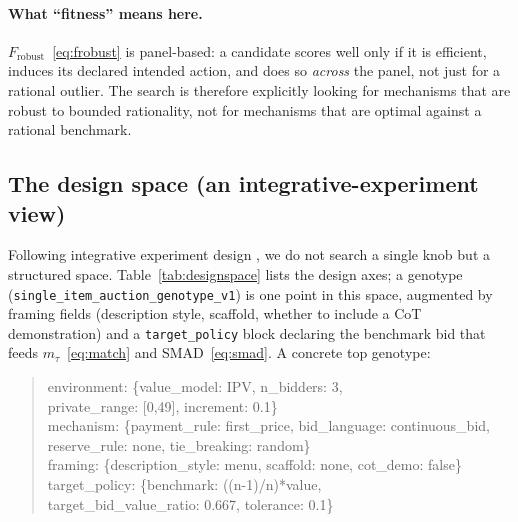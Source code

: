 \documentclass[12pt]{article}
\begin{document}
\paragraph{What ``fitness'' means here.} $F_{\mathrm{robust}}$~\eqref{eq:frobust}
is panel-based: a candidate scores well only if it is efficient, induces its
declared intended action, and does so \emph{across} the panel, not just for a
rational outlier. The search is therefore explicitly looking for mechanisms that
are robust to bounded rationality, not for mechanisms that are optimal against a
rational benchmark.

\subsection{The design space (an integrative-experiment view)}

Following integrative experiment design \citep{almaatouq2024,alsobay2025integrative},
we do not search a single knob but a structured space.
Table~\ref{tab:designspace} lists the design axes; a genotype
(\texttt{single\_item\_auction\_genotype\_v1}) is one point in this space, augmented
by framing fields (description style, scaffold, whether to include a CoT
demonstration) and a \texttt{target\_policy} block declaring the benchmark bid that
feeds $m_\tau$~\eqref{eq:match} and SMAD~\eqref{eq:smad}. A concrete top genotype:

\begin{quote}\footnotesize\ttfamily\noindent
environment: \{value\_model: IPV, n\_bidders: 3,\\
\hspace*{2em}private\_range: [0,49], increment: 0.1\}\\
mechanism: \{payment\_rule: first\_price, bid\_language: continuous\_bid,\\
\hspace*{2em}reserve\_rule: none, tie\_breaking: random\}\\
framing: \{description\_style: menu, scaffold: none, cot\_demo: false\}\\
target\_policy: \{benchmark: ((n-1)/n)*value,\\
\hspace*{2em}target\_bid\_value\_ratio: 0.667, tolerance: 0.1\}
\end{quote}
\end{document}
